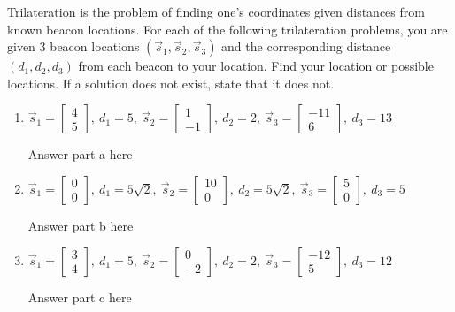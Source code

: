 \documentclass[11pt]{article}
\begin{document}
\begin{enumerate}
	      Trilateration is the problem of finding one’s coordinates given distances from known beacon locations. For each of the following trilateration problems, you are given 3 beacon locations $( \vec s_1, \vec s_2, \vec s_3)$ and the corresponding distance $(d_1, d_2, d_3)$ from each beacon to your location. Find your location or possible locations. If a solution does not exist, state that it does not.
	      \begin{enumerate}
	          \item $\vec s_1 = \begin{bmatrix} 4 \\ 5 \end{bmatrix}, \ 
	          d_1=5, \ 
	          \vec s_2 = \begin{bmatrix} 1 \\ -1 \end{bmatrix}, \ 
	          d_2=2, \ 
	          \vec s_3=\begin{bmatrix} -11 \\ 6 \end{bmatrix}, \ 
	          d_3=13$
	            \begin{Answer}
	                Answer part a here
	            \end{Answer}
	          \item $\vec s_1 = \begin{bmatrix} 0 \\ 0 \end{bmatrix}, \ 
	          d_1=5\sqrt 2, \ 
	          \vec s_2 = \begin{bmatrix} 10 \\ 0 \end{bmatrix}, \ 
	          d_2=5\sqrt 2, \ 
	          \vec s_3=\begin{bmatrix} 5 \\ 0 \end{bmatrix}, \ 
	          d_3=5$
	            \begin{Answer}
	                Answer part b here
	            \end{Answer}
	         \item $\vec s_1 = \begin{bmatrix} 3 \\ 4 \end{bmatrix}, \ 
	          d_1=5, \ 
	          \vec s_2 = \begin{bmatrix} 0 \\ -2 \end{bmatrix}, \ 
	          d_2=2, \ 
	          \vec s_3=\begin{bmatrix} -12 \\ 5 \end{bmatrix}, \ 
	          d_3=12$
	            \begin{Answer}
	                Answer part c here
	            \end{Answer}
	      \end{enumerate}
	      	      	             

\end{enumerate}
\end{document}
